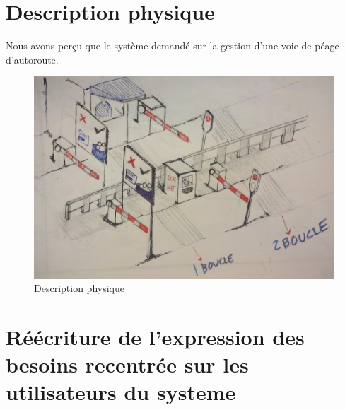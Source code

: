 \label{Cap:TD1}


\section{Description physique}
Nous avons perçu que le système demandé sur la gestion d’une voie de péage d’autoroute.

\begin{figure}[h]
    \centering
    \includegraphics[scale=0.16]{02_Desenvolvimento/TD1/images/desc.png}
    \caption{Description physique}
    \label{fig:my_label}
\end{figure}
\newpage
\section{Réécriture de l'expression des besoins recentrée sur les utilisateurs du systeme}
